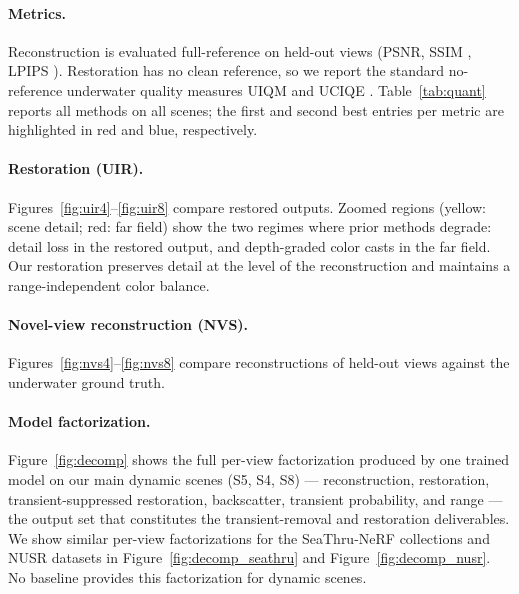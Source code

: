 \documentclass[11pt,a4paper]{article}
\begin{document}
\paragraph{Metrics.} Reconstruction is evaluated full-reference on held-out views (PSNR, SSIM \cite{wang2004image}, LPIPS \cite{zhang2018unreasonable}). Restoration has no clean reference, so we report the standard no-reference underwater quality measures UIQM \cite{panetta2015no} and UCIQE \cite{yang2013unsupervised}. Table~\ref{tab:quant} reports all methods on all scenes; the first and second best entries per metric are highlighted in red and blue, respectively.

\begin{table}[t]
\centering
\small

\caption{\textbf{Quantitative comparison.} Full-reference reconstruction metrics (PSNR/SSIM/LPIPS, against held-out underwater frames) and no-reference restoration metrics (UIQM/UCIQE, on the restored outputs). The \textcolor{firstbest}{\textbf{first best}} and \textcolor{secondbest}{\textbf{second best}} results are highlighted in red and blue, respectively.}
\label{tab:quant}
\end{table}

\paragraph{Restoration (UIR).} Figures~\ref{fig:uir4}--\ref{fig:uir8} compare restored outputs. Zoomed regions (yellow: scene detail; red: far field) show the two regimes where prior methods degrade: detail loss in the restored output, and depth-graded color casts in the far field. Our restoration preserves detail at the level of the reconstruction and maintains a range-independent color balance.

\paragraph{Novel-view reconstruction (NVS).} Figures~\ref{fig:nvs4}--\ref{fig:nvs8} compare reconstructions of held-out views against the underwater ground truth.

\paragraph{Model factorization.} Figure~\ref{fig:decomp} shows the full per-view factorization produced by one trained model on our main dynamic scenes (S5, S4, S8) --- reconstruction, restoration, transient-suppressed restoration, backscatter, transient probability, and range --- the output set that constitutes the transient-removal and restoration deliverables. We show similar per-view factorizations for the SeaThru-NeRF collections and NUSR datasets in Figure~\ref{fig:decomp_seathru} and Figure~\ref{fig:decomp_nusr}. No baseline provides this factorization for dynamic scenes.
\end{document}
